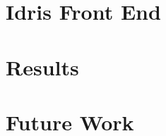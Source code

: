 \documentclass[runningheads]{llncs}
\begin{document}
	\section{Idris Front End} \label{sec:idris-front-end}
	
	
	\section{Results}
	
	
	\section{Future Work}
	
	
	
	
	
	

	
\end{document}
